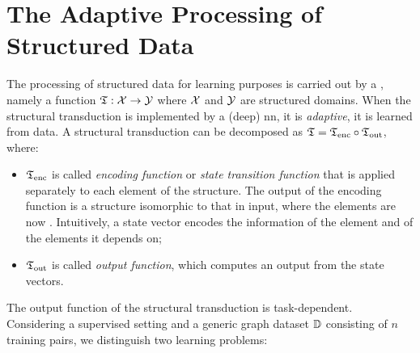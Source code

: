 \section{The Adaptive Processing of Structured Data}
The processing of structured data for learning purposes is carried out by a , namely a function $\Transduction: \Cal{x} \shortrightarrow \Cal{y}$ where $\Cal{X}$ and $\Cal{Y}$ are structured domains. When the structural transduction is implemented by a (deep) \gls{nn}, it is \emph{adaptive}, \ie it is learned from data. A structural transduction can be decomposed as $\mathfrak{T} = \mathfrak{T}_{\mathrm{enc}} \circ \mathfrak{T}_{\mathrm{out}}$, where:
\begin{itemize}
    \item $\mathfrak{T}_{\mathrm{enc}}$ is called \emph{encoding function} or \emph{state transition function} that is applied separately to each element of the structure. The output of the encoding function is a structure isomorphic to that in input, where the elements are now . Intuitively, a state vector encodes the information of the element and of the elements it depends on;
    \item $\mathfrak{T}_{\mathrm{out}}$ is called \emph{output function}, which computes an output from the state vectors.
\end{itemize}
The output function of the structural transduction is task-dependent. Considering a supervised setting and a generic graph dataset $\mathbb{D}$ consisting of $n$ training pairs, we distinguish two learning problems:
